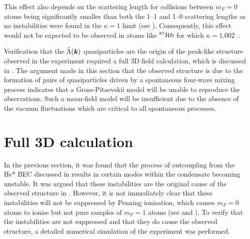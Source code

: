 This effect also depends on the scattering length for collisions between $m_F=0$ atoms being significantly smaller than both the 1--1 and 1--0 scattering lengths as no instabilities were found in the $\kappa = 1$ limit (see ). 
Consequently, this effect would not be expected to be observed in atoms like $^{87}\text{Rb}$ for which $\kappa = 1.002$~\citep{Kempen:2002,Widera:2006}.

Verification that the $\hat{\Lambda}(\bm{k})$ quasiparticles are the origin of the peak-like structure observed in the experiment required a full 3D field calculation, which is discussed in .  The argument made in this section that the observed structure is due to the formation of pairs of quasiparticles driven by a spontaneous four-wave mixing process indicates that a Gross-Pitaevskii model will be unable to reproduce the observations. Such a mean-field model will be insufficient due to the absence of the vacuum fluctuations which are critical to all spontaneous processes.

\section{Full 3D calculation}
\label{Peaks:3DCalculation}
In the previous section, it was found that the process of outcoupling from the He* BEC discussed in  results in certain modes within the condensate becoming unstable. It was argued that these instabilities are the original cause of the observed structure in . However, it is not immediately clear that these instabilities will not be suppressed by Penning ionisation, which causes $m_F=0$ atoms to ionise but not pure samples of $m_F=1$ atoms (see  and ). To verify that the instabilities are not suppressed and that they do cause the observed structure, a detailed numerical simulation of the experiment was performed.

